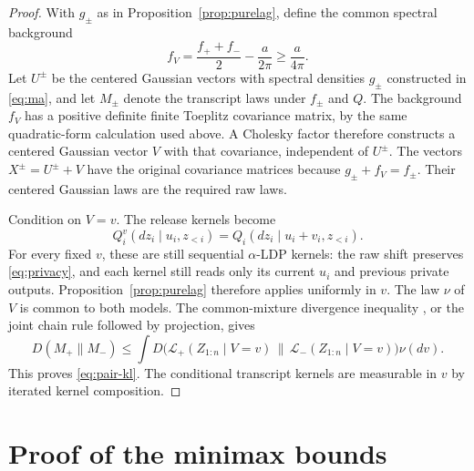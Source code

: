 \documentclass[11pt]{article}
\theoremstyle{remark}
\newcommand{\KL}{D}
\begin{document}
\begin{proof}
With $g_\pm$ as in Proposition~\ref{prop:purelag}, define the common
spectral background
\[
 f_V=\frac{f_++f_-}{2}-\frac{a}{2\pi}\ge\frac{a}{4\pi}.
\]
Let $U^\pm$ be the centered Gaussian vectors with spectral densities
$g_\pm$ constructed in \eqref{eq:ma}, and let $M_\pm$ denote the
transcript laws under $f_\pm$ and $Q$.
The background $f_V$ has a positive definite finite Toeplitz covariance matrix,
by the same
quadratic-form calculation used above. A Cholesky factor therefore constructs
a centered Gaussian vector $V$ with that covariance, independent of $U^\pm$.
The vectors $X^\pm=U^\pm+V$ have the original covariance matrices because
$g_\pm+f_V=f_\pm$. Their centered Gaussian laws are the required raw laws.

Condition on $V=v$. The release kernels become
\[
 Q_i^v(dz_i\mid u_i,z_{<i})
       =Q_i(dz_i\mid u_i+v_i,z_{<i}).
\]
For every fixed $v$, these are still sequential $\alpha$-LDP kernels:
the raw shift preserves \eqref{eq:privacy}, and each kernel still reads only
its current $u_i$ and previous private outputs. Proposition~\ref{prop:purelag}
therefore applies uniformly in $v$. The law $\nu$ of $V$ is common to both
models. The common-mixture divergence inequality \cite[Lemma 15]{IR},
or the joint chain rule followed by projection, gives
\[
 \KL(M_+\|M_-)
 \le\int \KL\bigl(\mathcal L_+(Z_{1:n}\mid V=v)\,
                  \|\,\mathcal L_-(Z_{1:n}\mid V=v)\bigr)\nu(dv).
\]
This proves \eqref{eq:pair-kl}. The conditional transcript kernels are
measurable in $v$ by iterated kernel composition.
\end{proof}

\section{Proof of the minimax bounds}\label{sec:minimax}
\end{document}
